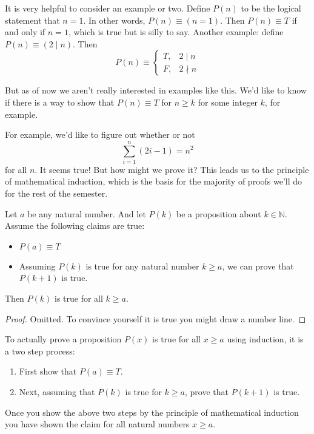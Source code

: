 It is very helpful to consider an example or two. Define $P(n)$ to be the logical statement that $n = 1$. In other words, $P(n) \equiv (n = 1)$. Then $P(n) \equiv T$ if and only if $n = 1$, which is true but is silly to say. Another example: define $P(n) \equiv (2 \mid n)$. Then
\[P(n) \equiv \begin{cases}T, & 2 \mid n \\ F, & 2 \nmid n\end{cases}\]

But as of now we aren't really interested in examples like this. We'd like to know if there is a way to show that $P(n) \equiv T$ for $n \geq k$ for some integer $k$, for example.

For example, we'd like to figure out whether or not
\[\sum_{i = 1}^n(2i - 1) = n^2\] for all $n$. It seems true! But how might we prove it? This leads us to the principle of mathematical induction, which is the basis for the majority of proofs we'll do for the rest of the semester.

\begin{theorem}
Let $a$ be any natural number. And let $P(k)$ be a proposition about $k \in \mathbb{N}$. Assume the following claims are true:
\begin{itemize}
    \item $P(a) \equiv T$
    \item Assuming $P(k)$ is true for any natural number $k \geq a$, we can prove that $P(k + 1)$ is true.
\end{itemize}

Then $P(k)$ is true for all $k \geq a$.
\end{theorem}
\begin{proof}
Omitted. To convince yourself it is true you might draw a number line.
\end{proof}

To actually prove a proposition $P(x)$ is true for all $x \geq a$ using induction, it is a two step process:

\begin{enumerate}
    \item First show that $P(a) \equiv T$.
    \item Next, assuming that $P(k)$ is true for $k \geq a$, prove that $P(k + 1)$ is true.
\end{enumerate}

Once you show the above two steps by the principle of mathematical induction you have shown the claim for all natural numbers $x \geq a$.

